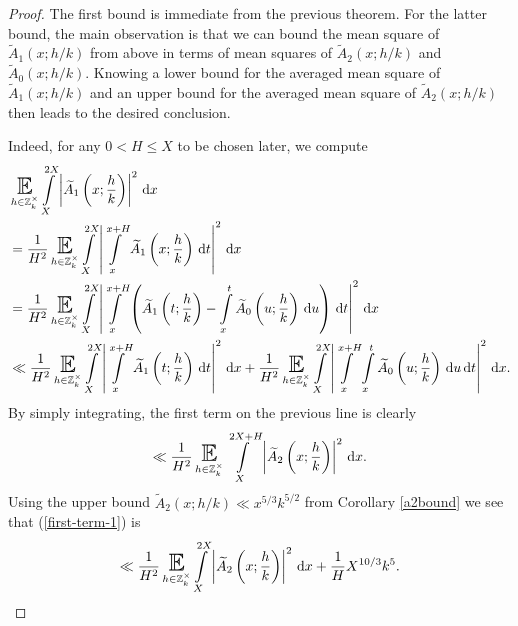 \documentclass[a4paper,10pt,twoside]{amsart}
\theoremstyle{definition}
\numberwithin{equation}{section}
\newcommand\E{\mathbb{E}}
\renewcommand\:{\colon}
\begin{document}
\begin{proof}
The first bound is immediate from the previous theorem. For the latter bound, the main observation is that we can bound the mean square of $\widetilde A_1(x;h/k)$ from above in terms of mean squares of $\widetilde A_2(x;h/k)$ and $\widetilde A_0(x;h/k)$. Knowing a lower bound for the averaged mean square of $\widetilde A_1(x;h/k)$ and an upper bound for the averaged mean square of $\widetilde A_2(x;h/k)$ then leads to the desired conclusion. 

Indeed, for any $0<H\leq X$ to be chosen later, we compute
\begin{align}\label{A_1toA_0estimate}
&\mathop{\text{\LARGE$\E$}}_{h\in\mathbb Z_k^\times}\int\limits_X^{2X}\left|\widetilde A_1\left(x;\frac hk\right)\right|^2\,\mathrm dx \nonumber\\
&=\frac1{H^2}\mathop{\text{\LARGE$\E$}}_{h\in\mathbb Z_k^\times}\int\limits_X^{2X}\left|\int\limits_x^{x+H}\widetilde A_1\left(x;\frac hk\right)\,\mathrm d t\right|^2\,\mathrm d x \nonumber\\
&=\frac1{H^2}\mathop{\text{\LARGE$\E$}}_{h\in\mathbb Z_k^\times}\int\limits_X^{2X}\left|\int\limits_x^{x+H}\left(\widetilde A_1\left(t;\frac hk\right)-\int\limits_x^t\widetilde A_0\left(u;\frac hk\right)\,\mathrm d u\right)\,\mathrm d t\right|^2\,\mathrm d x \nonumber\\
&\ll\frac1{H^2}\mathop{\text{\LARGE$\E$}}_{h\in\mathbb Z_k^\times}\int\limits_X^{2X}\left|\int\limits_x^{x+H}\widetilde A_1\left(t;\frac hk\right)\,\mathrm d t\right|^2\,\mathrm d x
+\frac1{H^2}\mathop{\text{\LARGE$\E$}}_{h\in\mathbb Z_k^\times}\int\limits_X^{2X}\left|\int\limits_x^{x+H}\int\limits_x^t\widetilde A_0\left(u;\frac hk\right)\,\mathrm d u\,\mathrm d t\right|^2\,\mathrm d x.
\end{align}
By simply integrating, the first term on the previous line is clearly 
\begin{align}\label{first-term-1}
\ll\frac1{H^2}\mathop{\text{\LARGE$\E$}}_{h\in\mathbb Z_k^\times}\int\limits_X^{2X+H}\left|\widetilde A_2\left(x;\frac hk\right)\right|^2\,\mathrm dx.
\end{align}
Using the upper bound $\widetilde A_2(x;h/k)\ll x^{5/3}k^{5/2}$ from Corollary \ref{a2bound} we see that (\ref{first-term-1}) is
\[ 
\ll\frac1{H^2}\mathop{\text{\LARGE$\E$}}_{h\in\mathbb Z_k^\times}\int\limits_X^{2X}\left|\widetilde A_2\left(x;\frac hk\right)\right|^2\,\mathrm dx+\frac1H X^{10/3}k^5.
\]


\end{proof}
\end{document}
